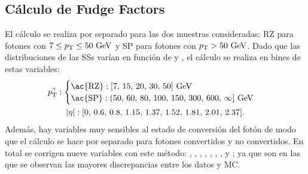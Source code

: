 \subsection{Cálculo de Fudge Factors}
\label{subsec:ss_corrections:ffs:calculation}





El cálculo se realiza por separado para las dos muestras consideradas: \ac{RZ} para fotones con \(7\leq p_{\text{T}}\leq 50~\text{GeV}\) y \ac{SP} para fotones con \(p_{\text{T}}> 50~\text{GeV}\). Dado que las distribuciones de las \acp{SS} varían en función de \pt y \abseta, el cálculo se realiza en bines de estas variables:
\begin{gather*}
    \ptgam:
    \begin{cases}
        \text{\ac{RZ}}: [7,\, 15,\, 20,\, 30,\, 50] ~\gev\\
        \text{\ac{SP}}: (50,\, 60,\, 80,\, 100,\, 150,\, 300,\, 600,\, \infty] ~\gev\\
    \end{cases}\\
    \abseta: [0,\, 0.6,\, 0.8,\, 1.15,\, 1.37,\, 1.52,\, 1.81,\, 2.01,\, 2.37].
\end{gather*}
Además, hay variables muy sensibles al estado de conversión del fotón de modo que el cálculo se hace por separado para fotones convertidos y no convertidos. En total se corrigen nueve variables con este método: \eratio, \fside, \reta, \rphi, \rhad, \rhado, \wone, \weta y \wstot; ya que son en las que se observan las mayores discrepancias entre los datos y \ac{MC}.

